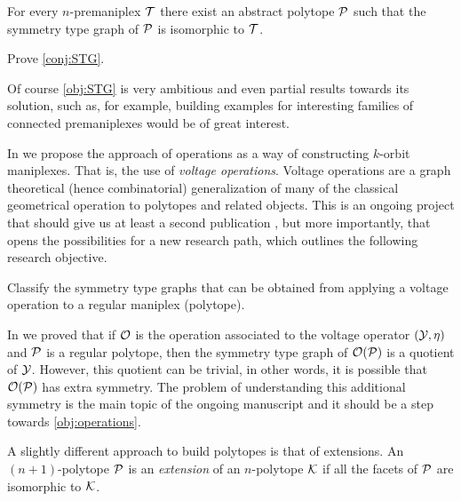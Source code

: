 \documentclass[a4paper,12pt,english]{article}
\begin{document}
\begin{conj}\label{conj:STG}
  For every $n$-premaniplex $\mathcal{T}$ there exist an abstract polytope $\mathcal{P}$ such that the symmetry type graph of $\mathcal{P}$ is isomorphic to $\mathcal{T}$.
\end{conj}


\begin{obj}\label{obj:STG}
  Prove \cref{conj:STG}.
\end{obj}

Of course \cref{obj:STG} is very ambitious and even partial results towards its solution, such as, for example, building examples for interesting families of connected premaniplexes would be of great interest.

In \cite{HubaMocMon2023_VoltageOperationsManiplexes} we propose the approach of operations as a way of constructing $k$-orbit maniplexes. 
That is, the use of \emph{voltage operations}. 
Voltage operations are a graph theoretical (hence combinatorial) generalization of many of the classical geometrical operation to polytopes and related objects.
This is an ongoing project that should give us at least a second publication \cite{HubaMocMon_SymmetriesVoltageOperations_preprint}, but more importantly, that opens the possibilities for a new research path, which outlines the following research objective.

\begin{obj} \label{obj:operations}
  Classify the symmetry type graphs that can be obtained from applying a voltage operation to a regular maniplex (polytope).
\end{obj}

In \cite[Thm 5.1]{HubaMocMon2023_VoltageOperationsManiplexes} we proved that if $\mathcal{O}$ is the operation associated to the voltage operator $(\mathcal{Y},\eta)$ and $\mathcal{P}$ is a regular polytope, then the symmetry type graph of $\mathcal{O}(\mathcal{P})$ is a quotient of $\mathcal{Y}$.
However, this quotient can be trivial, in other words, it is possible that $\mathcal{O}(\mathcal{P})$ has extra symmetry.
The problem of understanding this additional symmetry is the main topic of the ongoing manuscript \cite{HubaMocMon_SymmetriesVoltageOperations_preprint} and it should be a step towards \cref{obj:operations}.

A slightly different approach to build polytopes is that of extensions. An $(n+1)$-polytope $\mathcal{P}$ is an \emph{extension} of an $n$-polytope $\mathcal{K}$ if all the facets of $\mathcal{P}$ are isomorphic to $\mathcal{K}$.
\end{document}
